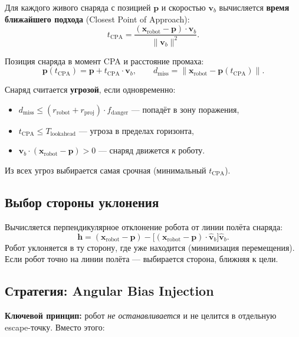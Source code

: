 \documentclass[12pt, a4paper]{article}
\theoremstyle{definition}
\theoremstyle{plain}
\begin{document}
Для каждого живого снаряда с позицией $\mathbf{p}$ и скоростью $\mathbf{v}_b$
вычисляется \textbf{время ближайшего подхода} (Closest Point of Approach):
\begin{equation}\label{eq:cpa}
  t_{\text{CPA}} = \frac{(\mathbf{x}_{\text{robot}} - \mathbf{p}) \cdot \mathbf{v}_b}
                        {\|\mathbf{v}_b\|^2}.
\end{equation}

Позиция снаряда в момент CPA и расстояние промаха:
\begin{equation}
  \mathbf{p}(t_{\text{CPA}}) = \mathbf{p} + t_{\text{CPA}} \cdot \mathbf{v}_b,
  \qquad
  d_{\text{miss}} = \|\mathbf{x}_{\text{robot}} - \mathbf{p}(t_{\text{CPA}})\|.
\end{equation}

Снаряд считается \textbf{угрозой}, если одновременно:
\begin{itemize}[nosep]
  \item $d_{\text{miss}} \le (r_{\text{robot}} + r_{\text{proj}}) \cdot f_{\text{danger}}$ --- попадёт в зону поражения,
  \item $t_{\text{CPA}} \le T_{\text{lookahead}}$ --- угроза в пределах горизонта,
  \item $\mathbf{v}_b \cdot (\mathbf{x}_{\text{robot}} - \mathbf{p}) > 0$ --- снаряд движется \emph{к} роботу.
\end{itemize}

Из всех угроз выбирается самая срочная (минимальный $t_{\text{CPA}}$).

\subsection{Выбор стороны уклонения}

Вычисляется перпендикулярное отклонение робота от линии полёта снаряда:
\[
  \mathbf{h} = (\mathbf{x}_{\text{robot}} - \mathbf{p})
             - \bigl[(\mathbf{x}_{\text{robot}} - \mathbf{p}) \cdot \hat{\mathbf{v}}_b\bigr]
               \hat{\mathbf{v}}_b.
\]
Робот уклоняется в ту сторону, где уже находится (минимизация перемещения).
Если робот точно на линии полёта --- выбирается сторона, ближняя к цели.

\subsection{Стратегия: Angular Bias Injection}

\textbf{Ключевой принцип:} робот \emph{не останавливается} и не целится в
отдельную escape-точку.  Вместо этого:
\end{document}
